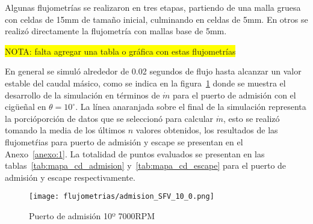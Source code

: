 
Algunas flujometrías se realizaron en tres etapas, partiendo de una malla gruesa
con celdas de 15mm de tamaño inicial, culminando en celdas de 5mm.
%
En otros se realizó directamente la flujometría con mallas base de 5mm.

\parbox{\textwidth}{\colorbox{yellow}{NOTA: falta agregar una tabla o gráfica
con estas flujometrías}}

En general se simuló alrededor de 0.02 segundos de flujo  hasta alcanzar un
valor estable del caudal másico, como se indica en la
figura~\ref{fig:adm_10_7000rpm} donde se muestra el desarrollo de la simulación
en términos de $\dot{m}$ para el puerto de admisión con el cigüeñal en
$\theta=10^{\circ}$.
%
La línea anaranjada sobre el final de la simulación representa la porcióporción
de datos que se seleccionó para calcular $\dot{m}$, esto se realizó tomando la
media de los últimos $n$ valores obtenidos, los resultados de las flujometŕias
para puerto de admisión y escape se presentan en el Anexo~\ref{anexo:1}.
%
La totalidad de puntos evaluados se presentan en las
tablas~\ref{tab:mapa_cd_admision} y~\ref{tab:mapa_cd_escape} para el puerto de
admisión y escape respectivamente.

\begin{figure}[ht]
  \centering
  \texttt{[image: flujometrias/admision\_SFV\_10\_0.png]}
  \caption{Puerto de admisión 10º \@ 7000RPM}\label{fig:adm_10_7000rpm}
\end{figure}

